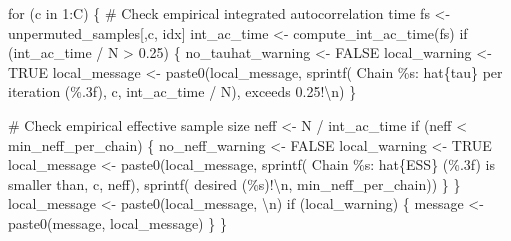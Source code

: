 \documentclass[
  letterpaper,
  DIV=11,
  numbers=noendperiod]{scrartcl}
\newenvironment{Shaded}{\begin{snugshade}}{\end{snugshade}}
\newcommand{\CommentTok}[1]{\textcolor[rgb]{0.37,0.37,0.37}{#1}}
\newcommand{\ConstantTok}[1]{\textcolor[rgb]{0.56,0.35,0.01}{#1}}
\newcommand{\ControlFlowTok}[1]{\textcolor[rgb]{0.00,0.23,0.31}{#1}}
\newcommand{\DecValTok}[1]{\textcolor[rgb]{0.68,0.00,0.00}{#1}}
\newcommand{\FloatTok}[1]{\textcolor[rgb]{0.68,0.00,0.00}{#1}}
\newcommand{\FunctionTok}[1]{\textcolor[rgb]{0.28,0.35,0.67}{#1}}
\newcommand{\NormalTok}[1]{\textcolor[rgb]{0.00,0.23,0.31}{#1}}
\newcommand{\OtherTok}[1]{\textcolor[rgb]{0.00,0.23,0.31}{#1}}
\newcommand{\SpecialCharTok}[1]{\textcolor[rgb]{0.37,0.37,0.37}{#1}}
\newcommand{\StringTok}[1]{\textcolor[rgb]{0.13,0.47,0.30}{#1}}
\begin{document}
\begin{Shaded}
\begin{Highlighting}[]
    \ControlFlowTok{for}\NormalTok{ (c }\ControlFlowTok{in} \DecValTok{1}\SpecialCharTok{:}\NormalTok{C) \{}
      \CommentTok{\# Check empirical integrated autocorrelation time}
\NormalTok{      fs }\OtherTok{\textless{}{-}}\NormalTok{ unpermuted\_samples[,c, idx]}
\NormalTok{      int\_ac\_time }\OtherTok{\textless{}{-}} \FunctionTok{compute\_int\_ac\_time}\NormalTok{(fs)}
      \ControlFlowTok{if}\NormalTok{ (int\_ac\_time }\SpecialCharTok{/}\NormalTok{ N }\SpecialCharTok{\textgreater{}} \FloatTok{0.25}\NormalTok{) \{}
\NormalTok{        no\_tauhat\_warning }\OtherTok{\textless{}{-}} \ConstantTok{FALSE}
\NormalTok{        local\_warning }\OtherTok{\textless{}{-}} \ConstantTok{TRUE}
\NormalTok{        local\_message }\OtherTok{\textless{}{-}}
          \FunctionTok{paste0}\NormalTok{(local\_message,}
                 \FunctionTok{sprintf}\NormalTok{(}\StringTok{\textquotesingle{}  Chain \%s: hat\{tau\} per iteration (\%.3f)\textquotesingle{}}\NormalTok{,}
\NormalTok{                         c, int\_ac\_time }\SpecialCharTok{/}\NormalTok{ N),}
                 \StringTok{\textquotesingle{} exceeds 0.25!}\SpecialCharTok{\textbackslash{}n}\StringTok{\textquotesingle{}}\NormalTok{)}
\NormalTok{      \}}

      \CommentTok{\# Check empirical effective sample size}
\NormalTok{      neff }\OtherTok{\textless{}{-}}\NormalTok{ N }\SpecialCharTok{/}\NormalTok{ int\_ac\_time}
      \ControlFlowTok{if}\NormalTok{ (neff }\SpecialCharTok{\textless{}}\NormalTok{ min\_neff\_per\_chain) \{}
\NormalTok{        no\_neff\_warning }\OtherTok{\textless{}{-}} \ConstantTok{FALSE}
\NormalTok{        local\_warning }\OtherTok{\textless{}{-}} \ConstantTok{TRUE}
\NormalTok{        local\_message }\OtherTok{\textless{}{-}}
          \FunctionTok{paste0}\NormalTok{(local\_message,}
                 \FunctionTok{sprintf}\NormalTok{(}\StringTok{\textquotesingle{}  Chain \%s: hat\{ESS\} (\%.3f) is smaller than\textquotesingle{}}\NormalTok{,}
\NormalTok{                         c, neff),}
                 \FunctionTok{sprintf}\NormalTok{(}\StringTok{\textquotesingle{} desired (\%s)!}\SpecialCharTok{\textbackslash{}n}\StringTok{\textquotesingle{}}\NormalTok{, min\_neff\_per\_chain))}
\NormalTok{      \}}
\NormalTok{    \}}
\NormalTok{    local\_message }\OtherTok{\textless{}{-}} \FunctionTok{paste0}\NormalTok{(local\_message, }\StringTok{\textquotesingle{}}\SpecialCharTok{\textbackslash{}n}\StringTok{\textquotesingle{}}\NormalTok{)}
    \ControlFlowTok{if}\NormalTok{ (local\_warning) \{}
\NormalTok{      message }\OtherTok{\textless{}{-}} \FunctionTok{paste0}\NormalTok{(message, local\_message)}
\NormalTok{    \}}
\NormalTok{  \}}


\end{Highlighting}
\end{Shaded}
\end{document}
